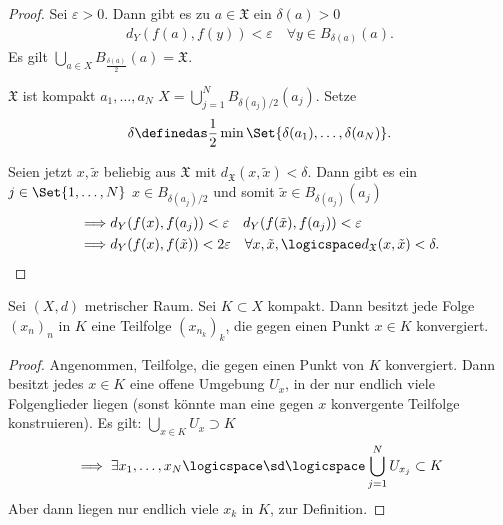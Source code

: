 \begin{proof}
    Sei \( \varepsilon>0 \). Dann gibt es zu \( a\in \mathfrak{X} \) ein \( \delta(a)>0 \) \sd
    \begin{align*}
        d_Y(f(a),f(y))<\varepsilon\quad \forall y\in B_{\delta(a)}(a).
    \end{align*}
    Es gilt \( \bigcup_{a\in X} B_{\frac{\delta(a)}{2}}(a)=\mathfrak{X}\).

    \( \mathfrak{X} \) ist kompakt \timplies \texists \( a_1,\ldots,a_N \) \sd \( X=\bigcup\limits_{j=1}^{N}B_{\delta(a_j)/2} (a_j)\). Setze 
    \begin{align*}
        \delta\definedas \frac{1}{2}\min\Set{\delta(a_1),\ldots,\delta(a_N)}.
    \end{align*}

    Seien jetzt \( x,\tilde{x} \) beliebig aus \( \mathfrak{X} \) mit \( d_{\mathfrak{X}}(x,\tilde{x})<\delta \). Dann gibt es ein \( j\in \Set{1,\ldots, N} \) \sd \( x\in B_{\delta(a_j)/2} \) und somit \( \tilde{x}\in B_{\delta(a_j)}(a_j) \)
    \begin{align*}
        \implies &d_Y(f(x),f(a_j))<\varepsilon \quad d_Y(f(\tilde{x}),f(a_j))<\varepsilon\\
        \implies &d_Y(f(x),f(\tilde{x}))<2\varepsilon \quad \forall x,\tilde{x},\logicspace d_{\mathfrak{X}}(x,\tilde{x})<\delta.
    \end{align*}
    
\end{proof}
\begin{satz}\label{bolzanoweierstrass}
    Sei \( (X,d) \) metrischer Raum. Sei \( K\subset X \) kompakt. Dann besitzt jede Folge \( (x_n)_n \) in \( K \) eine Teilfolge \( (x_{n_k})_k \), die gegen einen Punkt \( x\in K \) konvergiert. 
\end{satz}
\begin{proof}
    Angenommen, \tnexists Teilfolge, die gegen einen Punkt von \( K \) konvergiert. Dann besitzt jedes \( x\in K \) eine offene Umgebung \( U_x \), in der nur endlich viele Folgenglieder liegen (sonst könnte man eine gegen \( x \) konvergente Teilfolge konstruieren). Es gilt: \( \bigcup_{x\in K}U_x\supset K \)
    \begin{align*}
        \implies \exists x_1,\ldots, x_N\logicspace \sd \logicspace \bigcup_{j=1}^{N}U_{x_j}\subset K   
    \end{align*}
    Aber dann liegen nur endlich viele \( x_k \) in \( K \), \contra zur Definition.
    
\end{proof}



